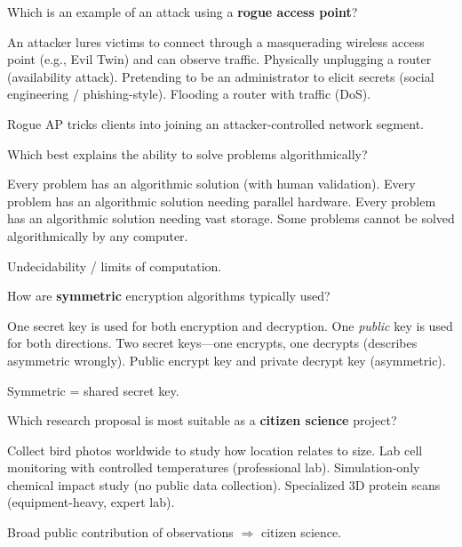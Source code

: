 \question[5]
Which is an example of an attack using a \textbf{rogue access point}?
\begin{choices}
  \CorrectChoice An attacker lures victims to connect through a masquerading wireless access point (e.g., Evil Twin) and can observe traffic.
  \choice Physically unplugging a router (availability attack).
  \choice Pretending to be an administrator to elicit secrets (social engineering / phishing-style).
  \choice Flooding a router with traffic (DoS).
\end{choices}
\begin{solution}
  Rogue AP tricks clients into joining an attacker-controlled network segment.
\end{solution}

\question[5]
Which best explains the ability to solve problems algorithmically?
\begin{choices}
  \choice Every problem has an algorithmic solution (with human validation).
  \choice Every problem has an algorithmic solution needing parallel hardware.
  \choice Every problem has an algorithmic solution needing vast storage.
  \CorrectChoice Some problems cannot be solved algorithmically by any computer.
\end{choices}
\begin{solution}
  Undecidability / limits of computation.
\end{solution}

\question[5]
How are \textbf{symmetric} encryption algorithms typically used?
\begin{choices}
  \CorrectChoice One secret key is used for both encryption and decryption.
  \choice One \emph{public} key is used for both directions.
  \choice Two secret keys---one encrypts, one decrypts (describes asymmetric wrongly).
  \choice Public encrypt key and private decrypt key (asymmetric).
\end{choices}
\begin{solution}
  Symmetric = shared secret key.
\end{solution}





\newpage



\question[5]
Which research proposal is most suitable as a \textbf{citizen science} project?
\begin{choices}
  \CorrectChoice Collect bird photos worldwide to study how location relates to size.
  \choice Lab cell monitoring with controlled temperatures (professional lab).
  \choice Simulation-only chemical impact study (no public data collection).
  \choice Specialized 3D protein scans (equipment-heavy, expert lab).
\end{choices}
\begin{solution}
  Broad public contribution of observations \(\Rightarrow\) citizen science.
\end{solution}

